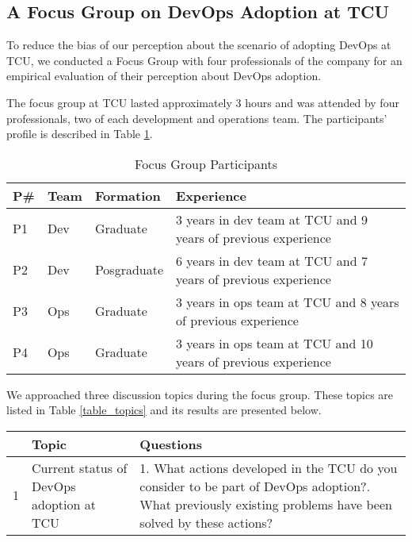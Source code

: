 \subsection{A Focus Group on DevOps Adoption at TCU}

{
\color{blue}
To reduce the bias of our perception about the scenario of adopting DevOps at
TCU, we conducted a Focus Group with four professionals of the company for an
empirical evaluation of their perception about DevOps adoption.

The focus group at TCU lasted approximately 3 hours and was attended by four
professionals, two of each development and operations team. The participants'
profile is described in Table \ref{focusgroup_part}.

\begin{table}[hb!]
\centering
\begin{tabular}{|p{0.6cm}|p{1.2cm}|p{2.5cm}|p{6cm}|} \hline
{\bf P\#} & {\bf Team} & {\bf Formation} & {\bf Experience}\\ \hline
P1 & Dev & Graduate & 3 years in dev team at TCU and 9 years of previous experience \\ \hline
P2 & Dev & Posgraduate & 6 years in dev team at TCU and 7 years of previous experience \\ \hline
P3 & Ops & Graduate & 3 years in ops team at TCU and 8 years of previous experience \\ \hline
P4 & Ops & Graduate & 3 years in ops team at TCU and 10 years of previous experience \\ \hline
\end{tabular}
\caption{Focus Group Participants}
\label{focusgroup_part}
\end{table}

We approached three discussion topics during the focus group. These topics are
listed in Table \ref{table_topics} and its results are presented below.

\begin{table}[hb!]
\centering
\begin{tabular}{|p{0.2cm}|p{3.4cm}|p{10cm}|} \hline
& \textbf{Topic} & \textbf{Questions} \\ \hline

1 & Current status of DevOps adoption at TCU &
1. What actions developed in the TCU do you consider to be part of DevOps adoption?\newline\newline
2. What previously existing problems have been solved by these actions? \\ \hline


\end{tabular}
\end{table}}
